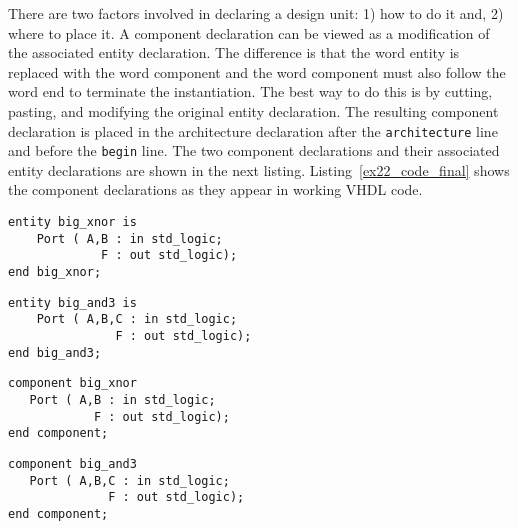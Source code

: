 There are two factors involved in declaring a design unit: 1) how to do it and, 2) where to place it. A component declaration can be viewed as a modification of the associated entity declaration. The difference is that the word entity is replaced with the word component and the word component must also follow the word end to terminate the instantiation. The best way to do this is by cutting, pasting, and modifying the original entity declaration. The resulting component declaration is placed in the architecture declaration after the \texttt{architecture} line and before the \texttt{begin} line. The two component declarations and their associated entity declarations are shown in the next listing. Listing~\ref{ex22_code_final} shows the component declarations as they appear in working VHDL code.

\begin{minipage}[t]{0.48\textwidth}
\vspace{0pt}
\noindent
\begin{lstlisting}[]
entity big_xnor is
    Port ( A,B : in std_logic;
             F : out std_logic);
end big_xnor;
\end{lstlisting}
\begin{lstlisting}[]
entity big_and3 is
    Port ( A,B,C : in std_logic;
               F : out std_logic);
end big_and3;
\end{lstlisting}
\end{minipage}
\begin{minipage}[t]{0.48\textwidth}
\vspace{0pt}\raggedright
\begin{lstlisting}[]
component big_xnor 
   Port ( A,B : in std_logic;
            F : out std_logic);
end component;
\end{lstlisting}
\begin{lstlisting}[]
component big_and3 
   Port ( A,B,C : in std_logic;
              F : out std_logic);
end component;
\end{lstlisting}
\end{minipage}

